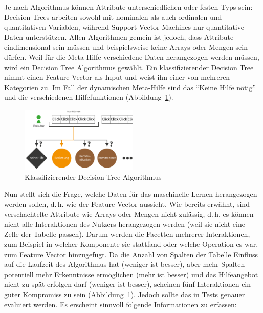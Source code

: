 \documentclass[
	headsepline,
	footsepline,
	fontsize=12pt,
	bibliography=totoc
]{scrbook}
\begin{document}
Je nach Algorithmus können Attribute unterschiedlichen oder festen Typs sein: Decision Trees arbeiten sowohl mit nominalen als auch ordinalen und quantitativen Variablen, während Support Vector Machines nur quantitative Daten unterstützen. Allen Algorithmen gemein ist jedoch, dass Attribute eindimensional sein müssen und beispielsweise keine Arrays oder Mengen sein dürfen. Weil für die Meta-Hilfe verschiedene Daten herangezogen werden müssen, wird ein Decision Tree Algorithmus gewählt. Ein klassifizierender Decision Tree nimmt einen Feature Vector als Input und weist ihn einer von mehreren Kategorien zu. Im Fall der dynamischen Meta-Hilfe sind das \enquote{Keine Hilfe nötig} und die verschiedenen Hilfefunktionen (Abbildung~\ref{figure:sml-ziel}).

\begin{figure}[htbp]
   \centering
   \includegraphics[width=0.5\textwidth]{images/konzeption-sml-ziel.png}
   \caption{Klassifizierender Decision Tree Algorithmus}
   \label{figure:sml-ziel}
\end{figure}

Nun stellt sich die Frage, welche Daten für das maschinelle Lernen herangezogen werden sollen, d.\,h. wie der Feature Vector aussieht. Wie bereits erwähnt, sind verschachtelte Attribute wie Arrays oder Mengen nicht zulässig, d.\,h. es können nicht alle Interaktionen des Nutzers herangezogen werden (weil sie nicht eine Zelle der Tabelle passen). Darum werden die Facetten mehrerer Interaktionen, zum Beispiel in welcher Komponente sie stattfand oder welche Operation es war, zum Feature Vector hinzugefügt. Da die Anzahl von Spalten der Tabelle Einfluss auf die Laufzeit des Algorithmus hat (weniger ist besser), aber mehr Spalten potentiell mehr Erkenntnisse ermöglichen (mehr ist besser) und das Hilfeangebot nicht zu spät erfolgen darf (weniger ist besser), scheinen fünf Interaktionen ein guter Kompromiss zu sein (Abbildung~\ref{figure:sml-ziel}). Jedoch sollte das in Tests genauer evaluiert werden. Es erscheint sinnvoll folgende Informationen zu erfassen:
\end{document}
